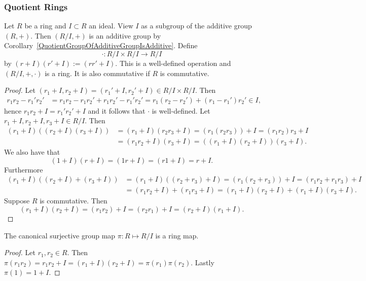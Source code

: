 \subsubsection{Quotient Rings}
    \begin{proposition}\label{QuotientRingIsRing}
    Let $R$ be a ring and $I\subset R$ an ideal. View $I$ as a subgroup of the additive group $(R,+)$. Then $(R/I,+)$ is an additive group by Corollary~\ref{QuotientGroupOfAdditiveGroupIsAdditive}. Define 
    $$\cdot : R/I\times R/I \rightarrow R/I$$
    by $(r+I)(r'+I):= (rr'+I)$. This is a well-defined operation and $(R/I, +,\cdot)$ is a ring. It is also commutative if $R$ is commutative.
\end{proposition}
\begin{proof}
    Let $(r_1+I,r_2+I) = (r_1'+I,r_2'+I)\in R/I\times R/I$. Then 
    \begin{align*}
        r_1r_2 - r_1'r_2' &= r_1r_2 - r_1r_2'+r_1r_2' - r_1'r_2' = r_1(r_2-r_2') + (r_1-r_1')r_2' \in I, 
    \end{align*}
    hence $r_1r_2 +I = r_1'r_2' + I $ and it follows that $\cdot$ is well-defined. 
    Let $r_1+I,r_2+I,r_3+I\in R/I$. Then 
    \begin{align*}
        (r_1+I)((r_2+I)(r_3+I)) &=(r_1+I)(r_2r_3+I) = (r_1(r_2r_3))+ I = (r_1r_2)r_3 + I\\ &= (r_1r_2+I)(r_3+I)= ((r_1+I)(r_2+I))(r_3+I).
    \end{align*}
    We also have that 
    $$(1+I)(r+I) = (1r+I) = (r1+I) = r+I.$$
    Furthermore 
    \begin{align*}
        (r_1+I)((r_2+I)+(r_3+I)) &= (r_1+I)((r_2+r_3)+I)=(r_1(r_2+r_3))+I = (r_1r_2+r_1r_3)+I\\ &= (r_1r_2+I) + (r_1r_3+I) = (r_1+I)(r_2+I)+(r_1+I)(r_3+I).
    \end{align*}
    Suppose $R$ is commutative. Then 
    $$(r_1+I)(r_2+I) = (r_1r_2)+I  = (r_2r_1)+I = (r_2+I)(r_1+I).$$
\end{proof}
\begin{corollary}
    The canonical surjective group map $\pi: R\mapsto R/I$ is a ring map.
\end{corollary}
\begin{proof}
    Let $r_1,r_2\in R$. Then $\pi(r_1r_2)=r_1r_2+I=(r_1+I)(r_2+I)=\pi(r_1)\pi(r_2)$. Lastly $\pi(1)=1+I$.
\end{proof}
